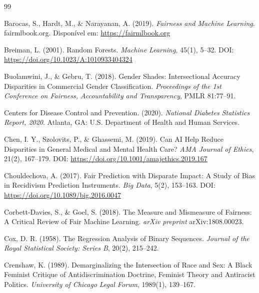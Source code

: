 
\begin{thebibliography}{99}

Barocas, S., Hardt, M., \& Narayanan, A. (2019). \textit{Fairness and 
Machine Learning}. fairmlbook.org. Disponível em: 
\url{https://fairmlbook.org}

Breiman, L. (2001). Random Forests. \textit{Machine Learning}, 45(1), 5--32. 
DOI: \url{https://doi.org/10.1023/A:1010933404324}

Buolamwini, J., \& Gebru, T. (2018). Gender Shades: Intersectional Accuracy 
Disparities in Commercial Gender Classification. \textit{Proceedings of the 
1st Conference on Fairness, Accountability and Transparency}, PMLR 81:77--91.

Centers for Disease Control and Prevention. (2020). \textit{National Diabetes 
Statistics Report, 2020}. Atlanta, GA: U.S. Department of Health and Human 
Services.

Chen, I. Y., Szolovits, P., \& Ghassemi, M. (2019). Can AI Help Reduce 
Disparities in General Medical and Mental Health Care? \textit{AMA Journal 
of Ethics}, 21(2), 167--179. DOI: \url{https://doi.org/10.1001/amajethics.2019.167}

Chouldechova, A. (2017). Fair Prediction with Disparate Impact: A Study of 
Bias in Recidivism Prediction Instruments. \textit{Big Data}, 5(2), 153--163. 
DOI: \url{https://doi.org/10.1089/big.2016.0047}

Corbett-Davies, S., \& Goel, S. (2018). The Measure and Mismeasure of 
Fairness: A Critical Review of Fair Machine Learning. \textit{arXiv preprint} 
arXiv:1808.00023.

Cox, D. R. (1958). The Regression Analysis of Binary Sequences. \textit{Journal 
of the Royal Statistical Society: Series B}, 20(2), 215--242.

Crenshaw, K. (1989). Demarginalizing the Intersection of Race and Sex: A 
Black Feminist Critique of Antidiscrimination Doctrine, Feminist Theory and 
Antiracist Politics. \textit{University of Chicago Legal Forum}, 1989(1), 
139--167.


\end{thebibliography}

